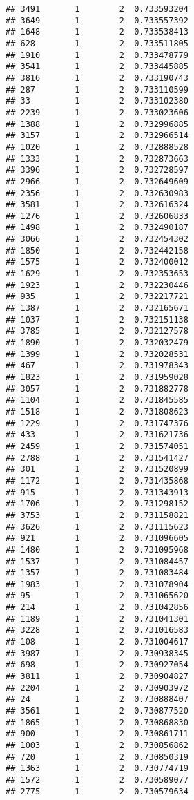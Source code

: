 \documentclass[
]{article}
\begin{document}
\begin{verbatim}
## 3491       1        2  0.733593204
## 3649       1        2  0.733557392
## 1648       1        2  0.733538413
## 628        1        2  0.733511805
## 1910       1        2  0.733478779
## 3541       1        2  0.733445885
## 3816       1        2  0.733190743
## 287        1        2  0.733110599
## 33         1        2  0.733102380
## 2239       1        2  0.733023606
## 1388       1        2  0.732996885
## 3157       1        2  0.732966514
## 1020       1        2  0.732888528
## 1333       1        2  0.732873663
## 3396       1        2  0.732728597
## 2966       1        2  0.732649609
## 2356       1        2  0.732630983
## 3581       1        2  0.732616324
## 1276       1        2  0.732606833
## 1498       1        2  0.732490187
## 3066       1        2  0.732454302
## 1850       1        2  0.732442158
## 1575       1        2  0.732400012
## 1629       1        2  0.732353653
## 1923       1        2  0.732230446
## 935        1        2  0.732217721
## 1387       1        2  0.732165671
## 1037       1        2  0.732151138
## 3785       1        2  0.732127578
## 1890       1        2  0.732032479
## 1399       1        2  0.732028531
## 467        1        2  0.731978343
## 1823       1        2  0.731959028
## 3057       1        2  0.731882778
## 1104       1        2  0.731845585
## 1518       1        2  0.731808623
## 1229       1        2  0.731747376
## 433        1        2  0.731621736
## 2459       1        2  0.731574051
## 2788       1        2  0.731541427
## 301        1        2  0.731520899
## 1172       1        2  0.731435868
## 915        1        2  0.731343913
## 1706       1        2  0.731298152
## 3753       1        2  0.731158821
## 3626       1        2  0.731115623
## 921        1        2  0.731096605
## 1480       1        2  0.731095968
## 1537       1        2  0.731084457
## 1357       1        2  0.731083484
## 1983       1        2  0.731078904
## 95         1        2  0.731065620
## 214        1        2  0.731042856
## 1189       1        2  0.731041301
## 3228       1        2  0.731016583
## 108        1        2  0.731004617
## 3987       1        2  0.730938345
## 698        1        2  0.730927054
## 3811       1        2  0.730904827
## 2204       1        2  0.730903972
## 24         1        2  0.730888407
## 3561       1        2  0.730877520
## 1865       1        2  0.730868830
## 900        1        2  0.730861711
## 1003       1        2  0.730856862
## 720        1        2  0.730850319
## 1363       1        2  0.730774719
## 1572       1        2  0.730589077
## 2775       1        2  0.730579634

\end{verbatim}
\end{document}
